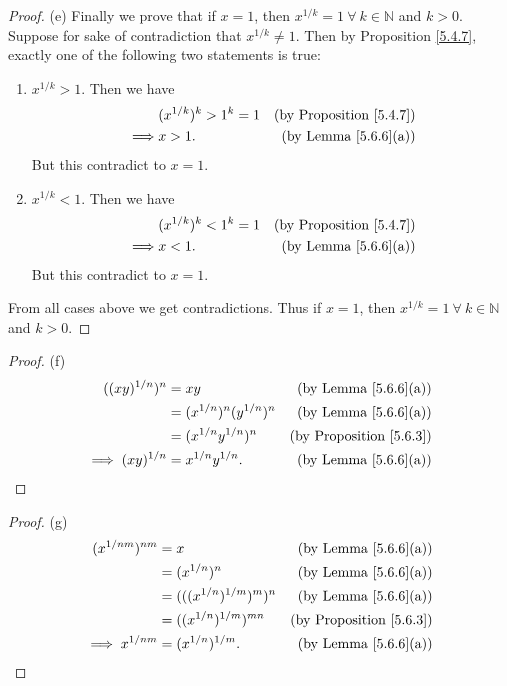 \begin{proof}{(e)}
Finally we prove that if \(x = 1\), then \(x^{1 / k} = 1 \ \forall\ k \in \mathds{N}\) and \(k > 0\).
Suppose for sake of contradiction that \(x^{1 / k} \neq 1\).
Then by Proposition \ref{5.4.7}, exactly one of the following two statements is true:
\begin{enumerate}[label=(\Roman*)]
    \item \(x^{1 / k} > 1\).
    Then we have
    \begin{align*}
        & (x^{1 / k})^k > 1^k = 1 & \text{(by Proposition \ref{5.4.7})} \\
        \implies & x > 1. & \text{(by Lemma \ref{5.6.6}(a))}
    \end{align*}
    But this contradict to \(x = 1\).
    \item \(x^{1 / k} < 1\).
    Then we have
    \begin{align*}
        & (x^{1 / k})^k < 1^k = 1 & \text{(by Proposition \ref{5.4.7})} \\
        \implies & x < 1. & \text{(by Lemma \ref{5.6.6}(a))}
    \end{align*}
    But this contradict to \(x = 1\).
\end{enumerate}
From all cases above we get contradictions.
Thus if \(x = 1\), then \(x^{1 / k} = 1 \ \forall\ k \in \mathds{N}\) and \(k > 0\).
\end{proof}

\begin{proof}{(f)}
\begin{align*}
((xy)^{1 / n})^n &= xy & \text{(by Lemma \ref{5.6.6}(a))} \\
&= (x^{1 / n})^n (y^{1 / n})^n & \text{(by Lemma \ref{5.6.6}(a))} \\
&= (x^{1 / n} y^{1 / n})^n & \text{(by Proposition \ref{5.6.3})} \\
\implies (xy)^{1 / n} &= x^{1 / n} y^{1 / n}. & \text{(by Lemma \ref{5.6.6}(a))}
\end{align*}
\end{proof}

\begin{proof}{(g)}
\begin{align*}
(x^{1 / nm})^{nm} &= x & \text{(by Lemma \ref{5.6.6}(a))} \\
&= (x^{1 / n})^n & \text{(by Lemma \ref{5.6.6}(a))} \\
&= (((x^{1 / n})^{1 / m})^m)^n & \text{(by Lemma \ref{5.6.6}(a))} \\
&= ((x^{1 / n})^{1 / m})^{mn} & \text{(by Proposition \ref{5.6.3})} \\
\implies x^{1 / nm} &= (x^{1 / n})^{1 / m}. & \text{(by Lemma \ref{5.6.6}(a))}
\end{align*}
\end{proof}

